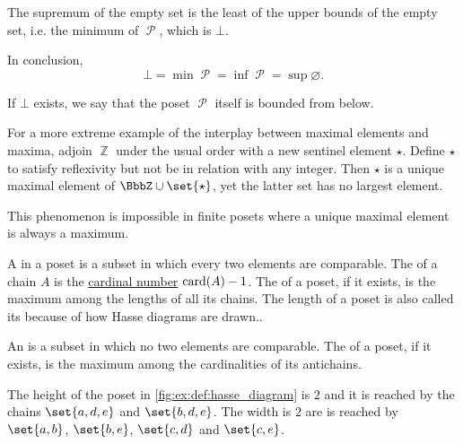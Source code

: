 \begin{definition}
\begin{thmenum}
\begin{minipage}[t]{0.45\textwidth}
      The supremum of the empty set is the least of the upper bounds of the empty set, i.e. the minimum of \( \mscrP \), which is \( \bot \).

      In conclusion,
      \begin{equation*}
        \bot = \min \mscrP = \inf \mscrP = \sup \varnothing.
      \end{equation*}

      If \( \bot \) exists, we say that the poset \( \mscrP \) itself is bounded from below.
    \end{minipage}
  \end{thmenum}
\end{definition}

\begin{example}\label{ex:unique_maximal_element_that_is_not_maximum}
  For a more extreme example of the interplay between maximal elements and maxima, adjoin \( \BbbZ \) under the usual order with a new sentinel element \( \star \). Define \( \star \) to satisfy reflexivity but not be in relation with any integer. Then \( \star \) is a unique maximal element of \( \BbbZ \cup \set{ \star } \), yet the latter set has no largest element.

  This phenomenon is impossible in finite posets where a unique maximal element is always a maximum.
\end{example}

\begin{definition}\label{def:poset_chain_and_antichain}
  A  in a poset is a subset in which every two elements are comparable. The  of a chain \( A \) is the \hyperref[def:cardinal]{cardinal number} \( \operatorname{card}(A) - 1 \). The  of a poset, if it exists, is the maximum among the lengths of all its chains. The length of a poset is also called its  because of how Hasse diagrams are drawn..

  An  is a subset in which no two elements are comparable. The  of a poset, if it exists, is the maximum among the cardinalities of its antichains.

  The height of the poset in \cref{fig:ex:def:hasse_diagram} is \( 2 \) and it is reached by the chains \( \set{ a, d, e } \) and \( \set{ b, d, e } \). The width is \( 2 \) are is reached by \( \set{ a, b } \), \( \set{ b, e } \), \( \set{ c, d } \) and \( \set{ c, e } \).
\end{definition}

